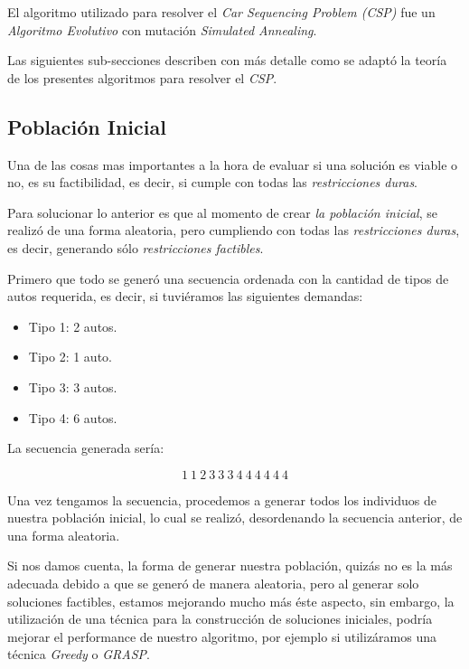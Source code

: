 
El algoritmo utilizado para resolver el \emph{Car Sequencing Problem (CSP)} fue un
\emph{Algoritmo Evolutivo} con mutación \emph{Simulated Annealing}.

Las siguientes sub-secciones describen con más detalle como se adaptó la teoría de
los presentes algoritmos para resolver el \emph{CSP}.

\subsection{Población Inicial}
Una de las cosas mas importantes a la hora de evaluar si una solución es viable o no,
es su factibilidad, es decir, si cumple con todas las \emph{restricciones duras}.

Para solucionar lo anterior es que al momento de crear \emph{la población inicial},
se realizó de una forma aleatoria, pero cumpliendo con todas las \emph{restricciones
duras}, es decir, generando sólo \emph{restricciones factibles}.

Primero que todo se generó una secuencia ordenada con la cantidad de tipos de autos
requerida, es decir, si tuviéramos las siguientes demandas:
\begin{itemize}
	\item Tipo 1: 2 autos.
	\item Tipo 2: 1 auto.
	\item Tipo 3: 3 autos.
	\item Tipo 4: 6 autos.
\end{itemize}
La secuencia generada sería:

$$1\ 1\ 2\ 3\ 3\ 3\ 4\ 4\ 4\ 4\ 4\ 4$$

Una vez tengamos la secuencia, procedemos a generar todos los individuos de nuestra población
inicial, lo cual se realizó, desordenando la secuencia anterior, de una forma aleatoria.

Si nos damos cuenta, la forma de generar nuestra población, quizás no es la más adecuada
debido a que se generó de manera aleatoria, pero al generar solo soluciones factibles,
estamos mejorando mucho más éste aspecto, sin embargo, la utilización de  una técnica para
la construcción de soluciones iniciales, podría mejorar el performance de nuestro algoritmo,
por ejemplo si utilizáramos una técnica \emph{Greedy} o \emph{GRASP}.


